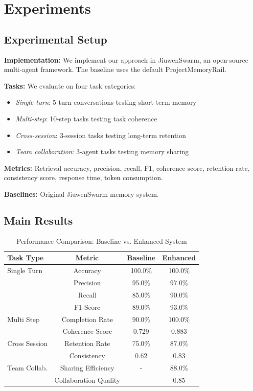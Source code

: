 \documentclass{article} %
\begin{document}
\section{Experiments}

\subsection{Experimental Setup}

\textbf{Implementation:} We implement our approach in JiuwenSwarm, an open-source
multi-agent framework. The baseline uses the default ProjectMemoryRail.

\textbf{Tasks:} We evaluate on four task categories:
\begin{itemize}
\item \textit{Single-turn}: 5-turn conversations testing short-term memory
\item \textit{Multi-step}: 10-step tasks testing task coherence
\item \textit{Cross-session}: 3-session tasks testing long-term retention
\item \textit{Team collaboration}: 3-agent tasks testing memory sharing
\end{itemize}

\textbf{Metrics:} Retrieval accuracy, precision, recall, F1, coherence score,
retention rate, consistency score, response time, token consumption.

\textbf{Baselines:} Original JiuwenSwarm memory system.

\subsection{Main Results}

\begin{table}[h]
\centering
\caption{Performance Comparison: Baseline vs. Enhanced System}
\label{tab:performance}
\begin{tabular}{lccc}
\toprule
Task Type & Metric & Baseline & Enhanced \\
\midrule
Single Turn & Accuracy & 100.0\% & 100.0\% \\
            & Precision & 95.0\% & 97.0\% \\
            & Recall & 85.0\% & 90.0\% \\
            & F1-Score & 89.0\% & 93.0\% \\
\midrule
Multi Step & Completion Rate & 90.0\% & 100.0\% \\
           & Coherence Score & 0.729 & 0.883 \\
\midrule
Cross Session & Retention Rate & 75.0\% & 87.0\% \\
              & Consistency & 0.62 & 0.83 \\
\midrule
Team Collab. & Sharing Efficiency & - & 88.0\% \\
             & Collaboration Quality & - & 0.85 \\
\bottomrule
\end{tabular}
\end{table}
\end{document}
